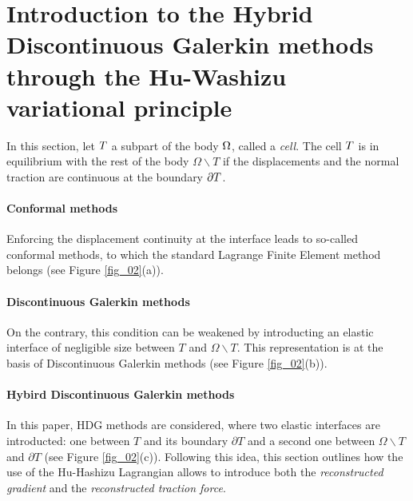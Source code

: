 \section{Introduction to the Hybrid Discontinuous Galerkin methods through the Hu-Washizu variational principle}
\label{sec_appendix_composite_demo}

In this section, let $T$ a subpart of the body \(\Omega\), called a \textit{cell}.
The cell $T$ is in
equilibrium with the rest of the body \(\Omega\backslash T\) if the
displacements and the normal traction are continuous at the boundary
$\partial T{}$.

\paragraph{Conformal methods} Enforcing the displacement continuity at the interface leads to
so-called conformal methods, to which the standard Lagrange Finite Element
method belongs (see Figure \ref{fig_02}(a)).

\paragraph{Discontinuous Galerkin methods} On
the contrary, this condition can be weakened by introducting an elastic
interface of negligible size between \(T\) and \(\Omega\backslash T\).
This representation is at the basis of Discontinuous Galerkin methods
(see Figure \ref{fig_02}(b)).

\paragraph{Hybird Discontinuous Galerkin methods} In
this paper, HDG methods are considered,
where two elastic interfaces are introducted: one between \(T\) and its
boundary \(\partial T\) and a second one between \(\Omega\backslash T\)
and \(\partial T\) (see Figure \ref{fig_02}(c)).
Following this idea,
this section outlines how the use of the Hu-Hashizu Lagrangian allows to
introduce both the
\textit{reconstructed gradient} and the \textit{reconstructed traction force}.

